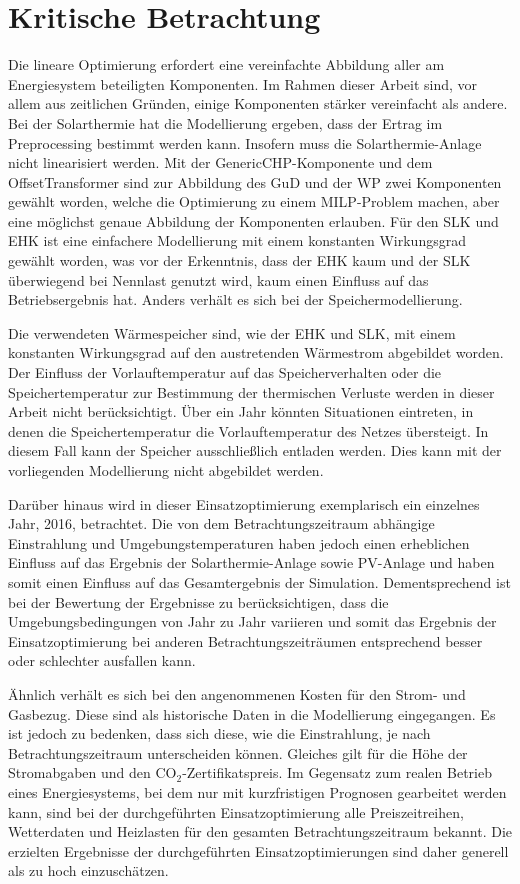 \section{Kritische Betrachtung}
Die lineare Optimierung erfordert eine vereinfachte Abbildung aller am Energiesystem beteiligten Komponenten. Im Rahmen dieser Arbeit sind, vor allem aus zeitlichen Gründen, einige Komponenten stärker vereinfacht als andere. Bei der Solarthermie hat die Modellierung ergeben, dass der Ertrag im Preprocessing bestimmt werden kann. Insofern muss die Solarthermie-Anlage nicht linearisiert werden. Mit der GenericCHP-Komponente und dem OffsetTransformer sind zur Abbildung des \ac{GuD} und der \ac{WP} zwei Komponenten gewählt worden, welche die Optimierung zu einem \ac{MILP}-Problem machen, aber eine möglichst genaue Abbildung der Komponenten erlauben. Für den \ac{SLK} und \ac{EHK} ist eine einfachere Modellierung mit einem konstanten Wirkungsgrad gewählt worden, was vor der Erkenntnis, dass der \ac{EHK} kaum und der \ac{SLK} überwiegend bei Nennlast genutzt wird, kaum einen Einfluss auf das Betriebsergebnis hat. Anders verhält es sich bei der Speichermodellierung.

Die verwendeten Wärmespeicher sind, wie der \ac{EHK} und \ac{SLK}, mit einem konstanten Wirkungsgrad auf den austretenden Wärmestrom abgebildet worden. Der Einfluss der Vorlauftemperatur auf das Speicherverhalten oder die Speichertemperatur zur Bestimmung der thermischen Verluste werden in dieser Arbeit nicht berücksichtigt. Über ein Jahr könnten Situationen eintreten, in denen die Speichertemperatur die Vorlauftemperatur des Netzes übersteigt. In diesem Fall kann der Speicher ausschließlich entladen werden. Dies kann mit der vorliegenden Modellierung nicht abgebildet werden.

Darüber hinaus wird in dieser Einsatzoptimierung exemplarisch ein einzelnes Jahr, 2016, betrachtet. Die von dem Betrachtungszeitraum abhängige Einstrahlung und Umgebungstemperaturen haben jedoch einen erheblichen Einfluss auf das Ergebnis der Solarthermie-Anlage sowie \ac{PV}-Anlage und haben somit einen Einfluss auf das Gesamtergebnis der Simulation. Dementsprechend ist bei der Bewertung der Ergebnisse zu berücksichtigen, dass die Umgebungsbedingungen von Jahr zu Jahr variieren und somit das Ergebnis der Einsatzoptimierung bei anderen Betrachtungszeiträumen entsprechend besser oder schlechter ausfallen kann.

Ähnlich verhält es sich bei den angenommenen Kosten für den Strom- und Gasbezug. Diese sind als historische Daten in die Modellierung eingegangen. Es ist jedoch zu bedenken, dass sich diese, wie die Einstrahlung, je nach Betrachtungszeitraum unterscheiden können. Gleiches gilt für die Höhe der Stromabgaben und den CO$_2$-Zertifikatspreis. Im Gegensatz zum realen Betrieb eines Energiesystems, bei dem nur mit kurzfristigen Prognosen gearbeitet werden kann, sind bei der durchgeführten Einsatzoptimierung alle Preiszeitreihen, Wetterdaten und Heizlasten für den gesamten Betrachtungszeitraum bekannt. Die erzielten Ergebnisse der durchgeführten Einsatzoptimierungen sind daher generell als zu hoch einzuschätzen.

